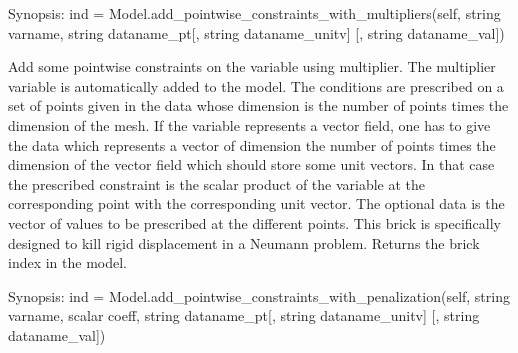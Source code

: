 \documentclass[a4paper,11pt,english]{sphinxmanual}
\begin{document}
\begin{fulllineitems}
\begin{fulllineitems}
\end{fulllineitems}


\begin{fulllineitems}
\label{\detokenize{python/cmdref_Model:getfem.Model.add_pointwise_constraints_with_multipliers}}
Synopsis: ind = Model.add\_pointwise\_constraints\_with\_multipliers(self, string varname, string dataname\_pt{[}, string dataname\_unitv{]} {[}, string dataname\_val{]})

Add some pointwise constraints on the variable  using
multiplier. The multiplier variable is automatically added to the model.
The conditions are prescribed on a set of points given in the data
 whose dimension is the number of points times the dimension
of the mesh.
If the variable represents a vector field, one has to give the data
 which represents a vector of dimension the number of
points times the dimension of the vector field which should store some
unit vectors. In that case the prescribed constraint is the scalar
product of the variable at the corresponding point with the corresponding
unit vector.
The optional data  is the vector of values to be prescribed
at the different points.
This brick is specifically designed to kill rigid displacement
in a Neumann problem.
Returns the brick index in the model.

\end{fulllineitems}


\begin{fulllineitems}
\label{\detokenize{python/cmdref_Model:getfem.Model.add_pointwise_constraints_with_penalization}}
Synopsis: ind = Model.add\_pointwise\_constraints\_with\_penalization(self, string varname, scalar coeff, string dataname\_pt{[}, string dataname\_unitv{]} {[}, string dataname\_val{]})


\end{fulllineitems}
\end{fulllineitems}
\end{document}

